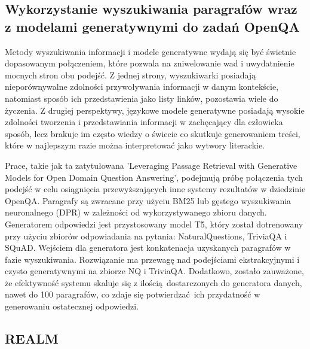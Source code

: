 \subsection{Wykorzystanie wyszukiwania paragrafów wraz z modelami generatywnymi do zadań OpenQA}

Metody wyszukiwania informacji i modele generatywne wydają się być świetnie dopasowanym połączeniem, które pozwala na zniwelowanie wad i uwydatnienie mocnych stron obu podejść. Z jednej strony, wyszukiwarki posiadają nieporównywalne zdolności przywoływania informacji w danym kontekście, natomiast sposób ich przedstawienia jako listy linków, pozostawia wiele do życzenia. Z drugiej perspektywy, językowe modele generatywne posiadają wysokie zdolności tworzenia i przedstawiania informacji w zachęcający dla człowieka sposób, lecz brakuje im często wiedzy o świecie co skutkuje generowaniem treści, które w najlepszym razie można interpretować jako wytwory literackie. \newline

Prace, takie jak ta zatytułowana 'Leveraging Passage Retrieval with Generative Models for Open Domain Question Answering', podejmują próbę połączenia tych podejść w celu osiągnięcia przewyższających inne systemy rezultatów w dziedzinie OpenQA. Paragrafy są zwracane przy użyciu BM25 lub gęstego wyszukiwania neuronalnego (DPR) w zależności od wykorzystywanego zbioru danych. Generatorem odpowiedzi jest przystosowany model T5, który został dotrenowany przy użyciu zbiorów odpowiadania na pytania: NaturalQuestions, TriviaQA i SQuAD. Wejściem dla generatora jest konkatenacja uzyskanych paragrafów w fazie wyszukiwania.\autocite{izacard2020leveraging} Rozwiązanie ma przewagę nad podejściami ekstrakcyjnymi i czysto generatywnymi na zbiorze NQ i TriviaQA. Dodatkowo, zostało zauważone, że efektywność systemu skaluje się z ilością dostarczonych do generatora danych, nawet do 100 paragrafów, co zdaje się potwierdzać ich przydatność w generowaniu ostatecznej odpowiedzi. \autocite{izacard2020leveraging}

\subsection{REALM}

